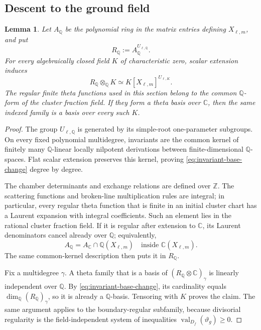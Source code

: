 \documentclass[11pt]{amsart}
\newtheorem{lemma}[theorem]{Lemma}
\theoremstyle{definition}
\theoremstyle{remark}
\begin{document}
\subsection{Descent to the ground field}

\begin{lemma}\label{lem:theta-characteristic-zero-descent}
Let $A_{\mathbb Q}$ be the polynomial ring in the matrix entries defining
$X_{\ell,m}$, and put
\[ R_{\mathbb Q}:=A_{\mathbb Q}^{U_{\ell,\mathbb Q}}. \]
For every algebraically closed field $K$ of characteristic zero, scalar
extension induces
\begin{equation}
 R_{\mathbb Q}\otimes_{\mathbb Q}K
 \simeq K[X_{\ell,m}]^{U_{\ell,K}}.
 \label{eq:invariant-base-change}
\end{equation}
The regular finite theta functions used in this section belong to the common
$\mathbb Q$-form of the cluster fraction field.  If they form a theta basis
over $\mathbb C$, then the same indexed family is a basis over every such
$K$.
\end{lemma}

\begin{proof}
The group $U_{\ell,\mathbb Q}$ is generated by its simple-root
one-parameter subgroups.  On every fixed polynomial multidegree, invariants
are the common kernel of finitely many $\mathbb Q$-linear locally nilpotent
derivations between finite-dimensional $\mathbb Q$-spaces.  Flat scalar
extension preserves this kernel, proving
\eqref{eq:invariant-base-change} degree by degree.

The chamber determinants and exchange relations are defined over
$\mathbb Z$.  The scattering functions and broken-line multiplication rules
are integral; in particular, every regular theta function that is finite in
an initial cluster chart has a Laurent expansion with integral
coefficients.  Such an element lies in the rational cluster fraction field.
If it is regular after extension to $\mathbb C$, its Laurent denominators
cancel already over $\mathbb Q$; equivalently,
\[ A_{\mathbb Q}=A_{\mathbb C}\cap\mathbb Q(X_{\ell,m}) \quad\text{inside }\mathbb C(X_{\ell,m}). \]
The same common-kernel description then puts it in $R_{\mathbb Q}$.

Fix a multidegree $\gamma$.  A theta family that is a basis of
$(R_{\mathbb Q}\otimes\mathbb C)_\gamma$ is linearly independent over
$\mathbb Q$.  By \eqref{eq:invariant-base-change}, its cardinality equals
$\dim_{\mathbb Q}(R_{\mathbb Q})_\gamma$, so it is already a
$\mathbb Q$-basis.  Tensoring with $K$ proves the claim.  The same argument
applies to the boundary-regular subfamily, because divisorial regularity is
the field-independent system of inequalities
$\operatorname{val}_{D_f}(\vartheta_g)\ge0$.
\end{proof}
\end{document}
